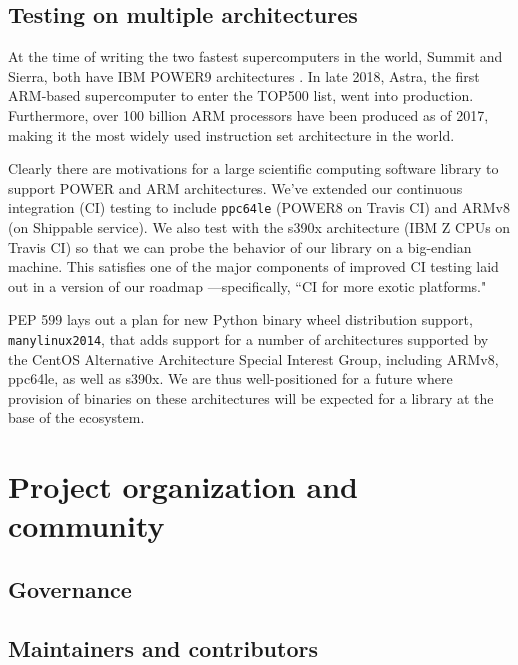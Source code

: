 \documentclass[fleqn,10pt]{wlscirep}
\begin{document}
\subsection*{Testing on multiple architectures}

At the time of writing the two fastest supercomputers in the
world, Summit and Sierra, both have IBM POWER9 architectures
\cite{top500nov2019}. In late 2018, Astra, the first ARM-based
supercomputer to enter the TOP500 list, went into production\cite{
astra-wiki}. Furthermore, over 100 billion ARM processors have been
produced as of 2017\cite{arm-architecture}, making it the most 
widely used instruction set architecture in the world.

Clearly there are motivations for a large scientific computing
software library to support POWER and ARM architectures. We've extended
our continuous integration (CI) testing to include \texttt{ppc64le}
(POWER8 on Travis CI) and ARMv8 (on Shippable service). We also test
with the s390x architecture (IBM Z CPUs on Travis CI) so that we
can probe the behavior of our library on a big-endian machine.
This satisfies one of the major components of
improved CI testing laid out in a version of our roadmap
\cite{numpy-roadmap}---specifically, ``CI for more exotic
platforms."

PEP 599\cite{PEP599} lays out a plan for new Python binary wheel
distribution support, \texttt{manylinux2014}, that adds
support for a number of architectures supported by the CentOS
Alternative Architecture Special Interest Group, including
ARMv8, ppc64le, as well as s390x. We are thus well-positioned
for a future where provision of binaries on these architectures
will be expected for a library at the base of the ecosystem.

\section*{Project organization and community}

\subsection*{Governance}


\subsection*{Maintainers and contributors}

\end{document}
